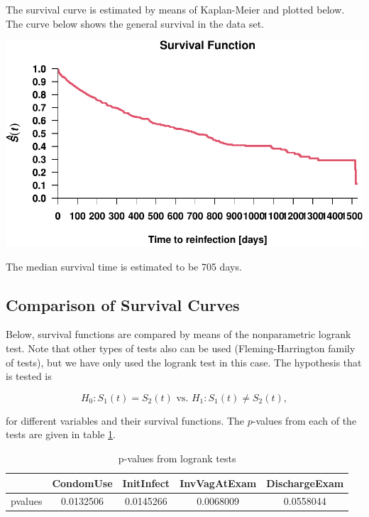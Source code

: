 \documentclass[
]{article}
\begin{document}
The survival curve is estimated by means of Kaplan-Meier and plotted below. The curve below shows the general survival in the data set.

\includegraphics{practical_files/figure-latex/unnamed-chunk-1-1.pdf}

The median survival time is estimated to be 705 days.

\hypertarget{comparison-of-survival-curves}{%
\subsection{Comparison of Survival Curves}\label{comparison-of-survival-curves}}

Below, survival functions are compared by means of the nonparametric logrank test. Note that other types of tests also can be used (Fleming-Harrington family of tests), but we have only used the logrank test in this case. The hypothesis that is tested is

\begin{equation}
        H_0: S_1(t) = S_2(t) \text{ vs. } H_1: S_1(t) \neq S_2(t),
\end{equation}

for different variables and their survival functions. The \(p\)-values from each of the tests are given in table \ref{tab:pvalues}.

\begin{table}

\caption{\label{tab:pvalues}p-values from logrank tests}
\centering
\begin{tabular}[t]{l|c|c|c|c}
\hline
  & CondomUse & InitInfect & InvVagAtExam & DischargeExam\\
\hline
pvalues & 0.0132506 & 0.0145266 & 0.0068009 & 0.0558044\\
\hline
\end{tabular}
\end{table}
\end{document}
